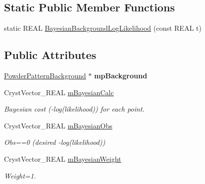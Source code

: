 \subsection*{Static Public Member Functions}
\begin{DoxyCompactItemize}
\item 
static R\+E\+AL \mbox{\hyperlink{class_obj_cryst_1_1_powder_pattern_background_bayesian_minimiser_a43c728298ae10f6f4d454a55abd9765d}{Bayesian\+Background\+Log\+Likelihood}} (const R\+E\+AL t)
\end{DoxyCompactItemize}
\subsection*{Public Attributes}
\begin{DoxyCompactItemize}
\item 
\mbox{\label{class_obj_cryst_1_1_powder_pattern_background_bayesian_minimiser_ab87e1261cd1824365908c4d67e9d696e}} 
\mbox{\hyperlink{class_obj_cryst_1_1_powder_pattern_background}{Powder\+Pattern\+Background}} $\ast$ {\bfseries mp\+Background}
\item 
\mbox{\label{class_obj_cryst_1_1_powder_pattern_background_bayesian_minimiser_a0dd792c01eec6984e566ae0c130a606c}} 
Cryst\+Vector\+\_\+\+R\+E\+AL \mbox{\hyperlink{class_obj_cryst_1_1_powder_pattern_background_bayesian_minimiser_a0dd792c01eec6984e566ae0c130a606c}{m\+Bayesian\+Calc}}
\begin{DoxyCompactList}\small\item\em Bayesian cost (-\/log(likelihood)) for each point. \end{DoxyCompactList}\item 
\mbox{\label{class_obj_cryst_1_1_powder_pattern_background_bayesian_minimiser_a0a5ae9cfa443f7a9d7b23029a65c235a}} 
Cryst\+Vector\+\_\+\+R\+E\+AL \mbox{\hyperlink{class_obj_cryst_1_1_powder_pattern_background_bayesian_minimiser_a0a5ae9cfa443f7a9d7b23029a65c235a}{m\+Bayesian\+Obs}}
\begin{DoxyCompactList}\small\item\em Obs==0 (desired -\/log(likelihood)) \end{DoxyCompactList}\item 
\mbox{\label{class_obj_cryst_1_1_powder_pattern_background_bayesian_minimiser_a22e183fdaaa7cc3f58297cdcabbb73ab}} 
Cryst\+Vector\+\_\+\+R\+E\+AL \mbox{\hyperlink{class_obj_cryst_1_1_powder_pattern_background_bayesian_minimiser_a22e183fdaaa7cc3f58297cdcabbb73ab}{m\+Bayesian\+Weight}}
\begin{DoxyCompactList}\small\item\em Weight=1. \end{DoxyCompactList}\end{DoxyCompactItemize}



